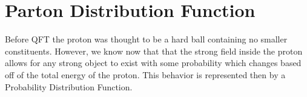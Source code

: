 \section{Parton Distribution Function} \label{sec:theory:pdf}

Before QFT the proton was thought to be a hard ball containing no smaller
constituents.  However, we know now that that the strong field inside the proton
allows for any strong object to exist with some probability which changes based
off of the total energy of the proton.  This behavior is represented then by a
Probability Distribution Function.
